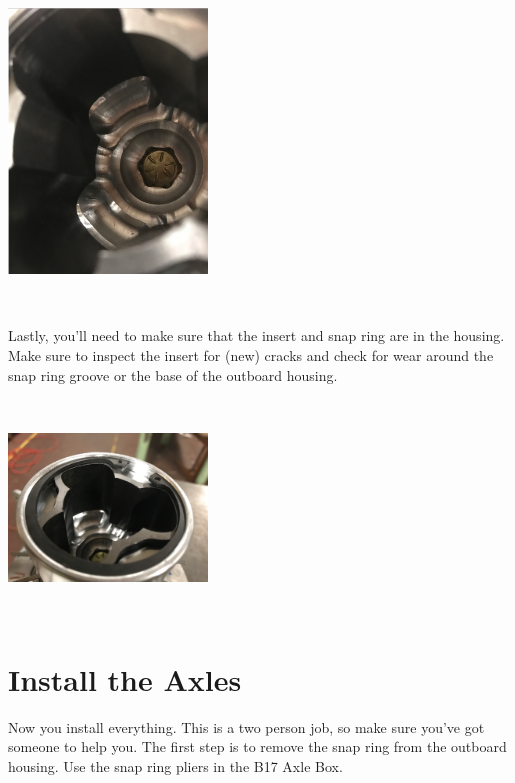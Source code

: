 \documentclass{article}
\begin{document}
\begin{minipage}{\linewidth}
$\,$

\begin{center}
\includegraphics[width = 150pt]{OutboardBolt.png}

\end{center}
$\,$
\end{minipage}

Lastly, you'll need to make sure that the insert and snap ring are in the housing. Make sure to inspect the insert for (new) cracks and check for wear around the snap ring groove or the base of the outboard housing.

\begin{minipage}{\linewidth}
$\,$

\begin{center}
\includegraphics[width = 150pt]{InsertPic.png}

\end{center}
$\,$
\end{minipage}


\section{Install the Axles}

Now you install everything. This is a two person job, so make sure you've got someone to help you. The first step is to remove the snap ring from the outboard housing. Use the snap ring pliers in the B17 Axle Box.
\end{document}
